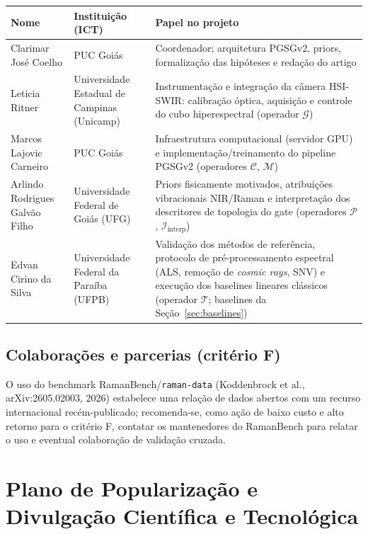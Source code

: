 \documentclass[11pt,a4paper]{article}
\begin{document}
\begin{center}
\begin{tabular}{p{3cm}p{3.3cm}p{7cm}}
\toprule
Nome & Instituição (ICT) & Papel no projeto \\
\midrule
Clarimar José Coelho & PUC Goiás & Coordenador; arquitetura PGSGv2, priors, formalização das hipóteses e redação do artigo \\
Leticia Ritner & Universidade Estadual de Campinas (Unicamp) & Instrumentação e integração da câmera HSI-SWIR: calibração óptica, aquisição e controle do cubo hiperespectral (operador $\mathcal{G}$) \\
Marcos Lajovic Carneiro & PUC Goiás & Infraestrutura computacional (servidor GPU) e implementação/treinamento do pipeline PGSGv2 (operadores $\mathcal{C}$, $\mathcal{M}$) \\
Arlindo Rodrigues Galvão Filho & Universidade Federal de Goiás (UFG) & Priors fisicamente motivados, atribuições vibracionais NIR/Raman e interpretação dos descritores de topologia do gate (operadores $\mathcal{P}$, $\mathcal{I}_{\text{interp}}$) \\
Edvan Cirino da Silva & Universidade Federal da Paraíba (UFPB) & Validação dos métodos de referência, protocolo de pré-processamento espectral (ALS, remoção de \emph{cosmic rays}, SNV) e execução dos baselines lineares clássicos (operador $\mathcal{T}$; baselines da Seção~\ref{sec:baselines}) \\
\bottomrule
\end{tabular}
\end{center}

\subsection{Colaborações e parcerias (critério F)}
O uso do benchmark RamanBench/\texttt{raman-data} (Koddenbrock et al., arXiv:2605.02003, 2026) estabelece uma relação de dados abertos com um recurso internacional recém-publicado; recomenda-se, como ação de baixo custo e alto retorno para o critério F, contatar os mantenedores do RamanBench para relatar o uso e eventual colaboração de validação cruzada.

\section{Plano de Popularização e Divulgação Científica e Tecnológica}
\label{sec:popularizacao}
\end{document}

